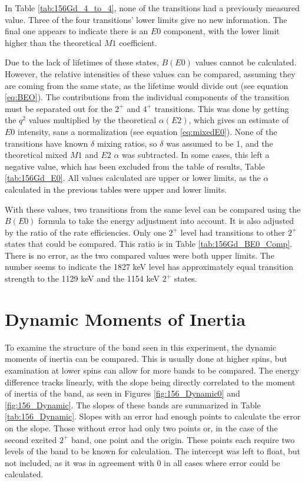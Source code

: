 In Table \ref{tab:156Gd_4_to_4}, none of the transitions had a previously measured value. Three of the four transitions' lower limits give no new information. The final one appears to indicate there is an $E0$ component, with the lower limit higher than the theoretical $M1$ coefficient. 
   
\afterpage{\clearpage}

Due to the lack of lifetimes of these states, $B(E0)$ values cannot be calculated. However, the relative intensities of these values can be compared, assuming they are coming from the same state, as the lifetime would divide out (see equation \ref{eq:BEO}). The contributions from the individual components of the transition must be separated out for the $2^+$ and $4^+$ transitions. This was done by getting the $q^2$ values multiplied by the theoretical $\alpha(E2)$, which gives an estimate of $E0$ intensity, sans a normalization (see equation \ref{eq:mixedE0}). None of the transitions have known $\delta$ mixing ratios, so $\delta$ was assumed to be 1, and the theoretical mixed $M1$ and $E2$ $\alpha$ was subtracted. In some cases, this left a negative value, which has been excluded from the table of results, Table \ref{tab:156Gd_E0}. All values calculated are upper or lower limits, as the $\alpha$ calculated in the previous tables were upper and lower limits.

\afterpage{\clearpage}

With these values, two transitions from the same level can be compared using the $B(E0)$ formula to take the energy adjustment into account. It is also adjusted by the ratio of the rate efficiencies. Only one $2^+$ level had transitions to other $2^+$ states that could be compared. This ratio is in Table \ref{tab:156Gd_BE0_Comp}. There is no error, as the two compared values were both upper limits. The number seems to indicate the 1827 keV level has approximately equal transition strength to the 1129 keV and the 1154 keV $2^+$ states.

\afterpage{\clearpage}

\section{Dynamic Moments of Inertia}

To examine the structure of the band seen in this experiment, the dynamic moments of inertia can be compared. This is usually done at higher spins, but examination at lower spins can allow for more bands to be compared. The energy difference tracks linearly, with the slope being directly correlated to the moment of inertia of the band, as seen in Figures \ref{fig:156_Dynamic0} and \ref{fig:156_Dynamic}. The slopes of these bands are summarized in Table \ref{tab:156_Dynamic}. Slopes with an error had enough points to calculate the error on the slope. Those without error had only two points or, in the case of the second excited $2^+$ band, one point and the origin. These points each require two levels of the band to be known for calculation. The intercept was left to float, but not included, as it was in agreement with 0 in all cases where error could be calculated.

